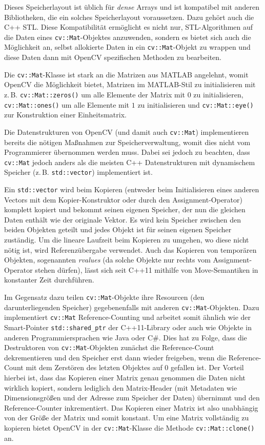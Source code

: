 \documentclass{whswinvcbook}
\begin{document}
Dieses Speicherlayout ist üblich für \textit{dense} Arrays und ist kompatibel mit anderen Bibliotheken, die ein solches Speicherlayout voraussetzen. Dazu gehört auch die C++ STL. Diese Kompatibilität ermöglicht es nicht nur, STL-Algorithmen auf die Daten eines \texttt{cv::Mat}-Objektes anzuwenden, sondern es bietet sich auch die Möglichkeit an, selbst allokierte Daten in ein \texttt{cv::Mat}-Objekt zu wrappen und diese Daten dann mit OpenCV spezifischen Methoden zu bearbeiten.

Die \texttt{cv::Mat}-Klasse ist stark an die Matrizen aus MATLAB angelehnt, womit OpenCV die Möglichkeit bietet, Matrizen im MATLAB-Stil zu initialisieren mit z.\,B. \texttt{cv::Mat::zeros()} um alle Elemente der Matrix mit $0$ zu initialisieren, \texttt{cv::Mat::ones()} um alle Elemente mit $1$ zu initialisieren und \texttt{cv::Mat::eye()} zur Konstruktion einer Einheitsmatrix.\cite{opencv2}

Die Datenstrukturen von OpenCV (und damit auch \texttt{cv::Mat}) implementieren bereits die nötigen Maßnahmen zur Speicherverwaltung, womit dies nicht vom Programmierer übernommen werden muss. Dabei sei jedoch zu beachten, dass \texttt{cv::Mat} jedoch anders als die meisten C++ Datenstrukturen mit dynamischem Speicher (z.\,B. \texttt{std::vector}) implementiert ist.

Ein \texttt{std::vector} wird beim Kopieren (entweder beim Initialisieren eines anderen Vectors mit dem Kopier-Konstruktor oder durch den Assignment-Operator) komplett kopiert und bekommt seinen eigenen Speicher, der nun die gleichen Daten enthält wie der originale Vektor. Es wird kein Speicher zwischen den beiden Objekten geteilt und jedes Objekt ist für seinen eigenen Speicher zuständig. Um die lineare Laufzeit beim Kopieren zu umgehen, wo diese nicht nötig ist, wird Referenzübergabe verwendet. Auch das Kopieren von temporären Objekten, sogenannten \textit{rvalues} (da solche Objekte nur rechts vom Assignment-Operator stehen dürfen), lässt sich seit C++11 mithilfe von Move-Semantiken in konstanter Zeit durchführen.

Im Gegensatz dazu teilen \texttt{cv::Mat}-Objekte ihre Resourcen (den darunterliegenden Speicher) gegebenenfalls mit anderen \texttt{cv::Mat}-Objekten. Dazu implementiert \texttt{cv::Mat} Reference-Counting und arbeitet somit ähnlich wie der Smart-Pointer \texttt{std::shared\_ptr} der C++11-Library oder auch wie Objekte in anderen Programmiersprachen wie Java oder C\#. Dies hat zu Folge, dass die Destruktoren von \texttt{cv::Mat}-Objekten zunächst die Reference-Count dekrementieren und den Speicher erst dann wieder freigeben, wenn die Reference-Count mit dem Zerstören des letzten Objektes auf $0$ gefallen ist. Der Vorteil hierbei ist, dass das Kopieren einer Matrix genau genommen die Daten nicht wirklich kopiert, sondern lediglich den Matrix-Header (mit Metadaten wie Dimensionsgrößen und der Adresse zum Speicher der Daten) übernimmt und den Reference-Counter inkrementiert. Das Kopieren einer Matrix ist also unabhängig von der Größe der Matrix und somit konstant. Um eine Matrix vollständig zu kopieren bietet OpenCV in der \texttt{cv::Mat}-Klasse die Methode \texttt{cv::Mat::clone()} an.
\end{document}
